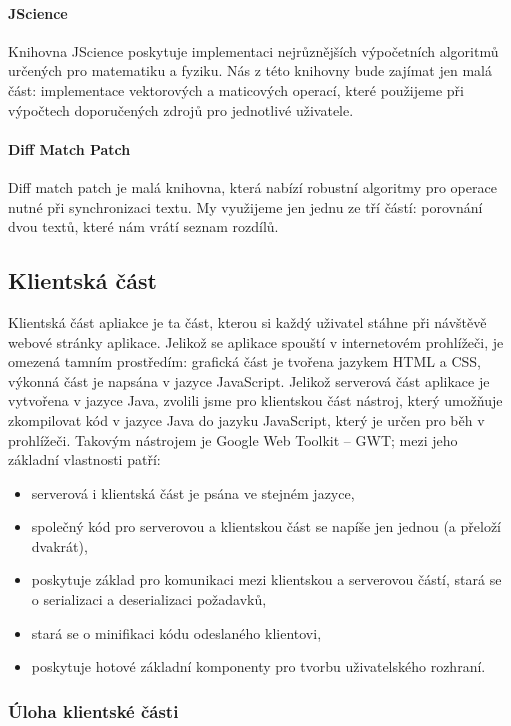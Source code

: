 \paragraph{JScience}
Knihovna JScience poskytuje implementaci nejrůznějších výpočetních algoritmů určených pro matematiku a fyziku.
Nás z této knihovny bude zajímat jen malá část: implementace vektorových a maticových operací, které použijeme při výpočtech doporučených zdrojů pro jednotlivé uživatele.

\paragraph{Diff Match Patch}
Diff match patch je malá knihovna, která nabízí robustní algoritmy pro operace nutné při synchronizaci textu.
My využijeme jen jednu ze tří částí: porovnání dvou textů, které nám vrátí seznam rozdílů.

\subsection{Klientská část}

Klientská část apliakce je ta část, kterou si každý uživatel stáhne při návštěvě webové stránky aplikace.
Jelikož se aplikace spouští v internetovém prohlížeči, je omezená tamním prostředím: grafická část je tvořena jazykem HTML a CSS, výkonná část je napsána v jazyce JavaScript.
Jelikož serverová část aplikace je vytvořena v jazyce Java, zvolili jsme pro klientskou část nástroj, který umožňuje zkompilovat kód v jazyce Java do jazyku JavaScript, který je určen pro běh v prohlížeči.
Takovým nástrojem je Google Web Toolkit -- GWT; mezi jeho základní vlastnosti patří:
\begin{itemize}
	\item serverová i klientská část je psána ve stejném jazyce,
	\item společný kód pro serverovou a klientskou část se napíše jen jednou (a přeloží dvakrát),
	\item poskytuje základ pro komunikaci mezi klientskou a serverovou částí, stará se o serializaci a deserializaci požadavků,
	\item stará se o minifikaci kódu odeslaného klientovi,
	\item poskytuje hotové základní komponenty pro tvorbu uživatelského rozhraní.
\end{itemize}

\subsubsection{Úloha klientské části}

